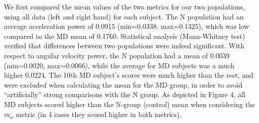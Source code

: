 We first compared the mean values of the two metrics for our two populations, using all data (left and right hand) for each subject. The N population had an average acceleration power of 0.0915 (min=0.0338, max=0.1325), which was low compared to the MD mean of 0.1760. Statistical analysis (Mann-Whitney test) verified that differences between two populations were indeed significant. With respect to angular velocity power, the N population had a mean of 0.0039 (min=0.0020, max=0.0066), while the average for MD subjects was a much higher 0.0224. The 10th MD subject’s scores were much higher than the rest, and were excluded when calculating the mean for the MD group, in order to avoid “artificially” strong comparisons with the N group. As depicted in Figure 4, all MD subjects scored higher than the N-group (control) mean when considering the $m_{\omega}$ metric (in 4 cases they scored higher in both metrics).

